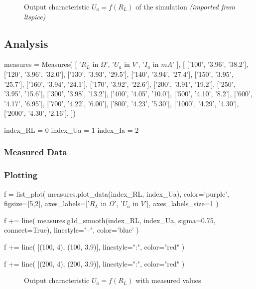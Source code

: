 \begin{figure}[H]
    \centering
    \caption{Output characteristic \textbf{$U_{a} = f(R_L)$} of the simulation \textit{(imported from ltspice)}}
\end{figure}

\subsection{Analysis}

\begin{sagesilent}
    measures = Measures(
        [
            '$R_L$ in $\Omega$',
            '$U_a$ in $V$', 
            '$I_a$ in $mA$'
        ], [
            ['100', '3.96', '38.2'],
            ['120', '3.96', '32.0'],
            ['130', '3.93', '29.5'],
            ['140', '3.94', '27.4'],
            ['150', '3.95', '25.7'],
            ['160', '3.94', '24.1'],
            ['170', '3.92', '22.6'],
            ['200', '3.91', '19.2'],
            ['250', '3.95', '15.6'],
            ['300', '3.98', '13.2'],
            ['400', '4.05', '10.0'],
            ['500', '4.10', '8.2'],
            ['600', '4.17', '6.95'],
            ['700', '4.22', '6.00'],
            ['800', '4.23', '5.30'],
            ['1000', '4.29', '4.30'],
            ['2000', '4.30', '2.16'],
    ])

    index_RL = 0
    index_Ua = 1
    index_Ia = 2
\end{sagesilent}

\subsubsection{Measured Data}

\begin{center}
    \renewcommand{\arraystretch}{1.2}
\end{center}

\subsubsection{Plotting}

\begin{sagesilent}
    f = list_plot(
        measures.plot_data(index_RL, index_Ua),
        color='purple',
        figsize=[5,2],
        axes_labels=['$R_L$ in $\Omega$', '$U_a$ in $V$'],
        axes_labels_size=1
    )

    f += line(
        measures.g1d_smooth(index_RL, index_Ua, sigma=0.75, connect=True),
        linestyle="--",
        color='blue'
    )

    f += line(
        [(100, 4), (100, 3.9)],
        linestyle=":",
        color="red"
    )

    f += line(
        [(200, 4), (200, 3.9)],
        linestyle=":",
        color="red"
    )
\end{sagesilent}

\begin{figure}[H]
    \centering
    \caption{Output characteristic \textbf{$U_{a} = f(R_L)$} with measured values}
\end{figure}